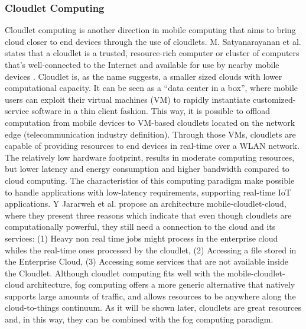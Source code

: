 \subsubsection{Cloudlet Computing}
Cloudlet computing is another direction in mobile computing that aims to bring cloud closer to end devices through the use of cloudlets. M. Satyanarayanan et al. states that a cloudlet is a trusted, resource-rich computer or cluster of computers that's well-connected to the Internet and available for use by nearby mobile devices \cite{satyanarayanan2009case}. Cloudlet is, as the name suggests, a smaller sized clouds with lower computational capacity. It can be seen as a ``data center in a box'', where mobile users can exploit their virtual machines (VM) to rapidly instantiate customized-service software in a thin client fashion. This way, it is possible to offload computation from mobile devices to VM-based cloudlets located on the network edge (telecommunication industry definition). Through those VMs, cloudlets are capable of providing resources to end devices in real-time over a WLAN network. The relatively low hardware footprint, results in moderate computing resources, but lower latency and energy consumption and higher bandwidth compared to cloud computing. The characteristics of this computing paradigm make possible to handle applications with low-latency requirements, supporting real-time IoT applications. Y Jararweh et al. \cite{jararweh2013resource} propose an architecture mobile-cloudlet-cloud, where they present three reasons which indicate that even though cloudlets are computationally powerful, they still need a connection to the cloud and its services: (1) Heavy non real time jobs might process in the enterprise cloud whiles the real-time ones processed by the cloudlet, (2) Accessing a file stored in the Enterprise Cloud, (3) Accessing some services that are not available inside the Cloudlet. Although cloudlet computing fits well with the mobile-cloudlet-cloud architecture, fog computing offers a more generic alternative that natively supports large amounts of traffic, and allows resources to be anywhere along the cloud-to-things continuum. As it will be shown later, cloudlets are great resources and, in this way, they can be combined with the fog computing paradigm.

